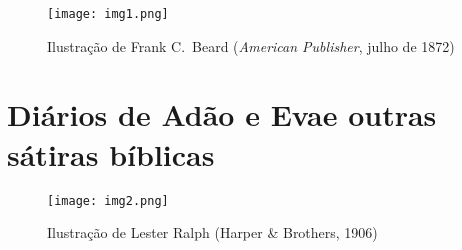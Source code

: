 \documentclass[11pt]{hedrabook}
\begin{document}
\ifodd\thepage\paginabranca\fi

\endgroup
\setcounter{tocdepth}{0}     %
\setcounter{secnumdepth}{-2} %

\hedratoc



%
\thispagestyle{empty}
\begin{figure}\begin{center}
	\texttt{[image: img1.png]}
	\begin{footnotesize}Ilustração de Frank C.~Beard (\emph{American Publisher}, julho de 1872)
	\end{footnotesize}
\end{center}\end{figure}%
%

%
\bgroup\makeatletter\def\@endpart{\vfil\newpage}
\part[Diários de Adão e Eva\\ e outras sátiras bíblicas]{Diários de Adão e Eva\break e outras sátiras bíblicas} 
\makeatother\egroup
%
\thispagestyle{empty}	
\begin{figure}\begin{center}
	\texttt{[image: img2.png]}
	\begin{footnotesize}Ilustração de Lester Ralph (Harper \& Brothers, 1906)
	\end{footnotesize}
\end{center}\end{figure}
%




\ifdefined\printcheck\printcheck\fi
\end{document}
